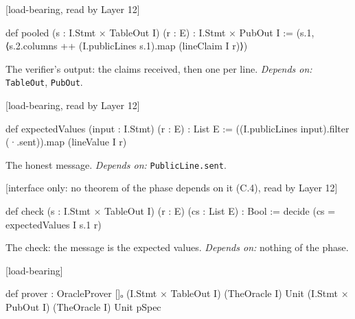 \par\medskip\noindent\textbf{}\hfill\textsf{\small [load-bearing, read by Layer 12]}\par\nopagebreak

\begin{leancode}
def pooled (s : I.Stmt × TableOut I) (r : E) : I.Stmt × PubOut I := (s.1, ⟨s.2.columns ++ (I.publicLines s.1).map (lineClaim I r)⟩)
\end{leancode}


The verifier's output: the claims received, then one per line. \emph{Depends on:} \texttt{TableOut}, \texttt{PubOut}.

\par\medskip\noindent\textbf{}\hfill\textsf{\small [load-bearing, read by Layer 12]}\par\nopagebreak

\begin{leancode}
def expectedValues (input : I.Stmt) (r : E) : List E := ((I.publicLines input).filter (·.sent)).map (lineValue I r)
\end{leancode}


The honest message. \emph{Depends on:} \texttt{PublicLine.\allowbreak{}sent}.

\par\medskip\noindent\textbf{}\hfill\textsf{\small [interface only: no theorem of the phase depends on it (C.4), read by Layer 12]}\par\nopagebreak

\begin{leancode}
def check (s : I.Stmt × TableOut I) (r : E) (cs : List E) : Bool := decide (cs = expectedValues I s.1 r)
\end{leancode}


The check: the message is the expected values. \emph{Depends on:} nothing of the phase.

\par\medskip\noindent\textbf{}\hfill\textsf{\small [load-bearing]}\par\nopagebreak

\begin{leancode}
def prover : OracleProver []ₒ (I.Stmt × TableOut I) (TheOracle I) Unit (I.Stmt × PubOut I) (TheOracle I) Unit pSpec
\end{leancode}

